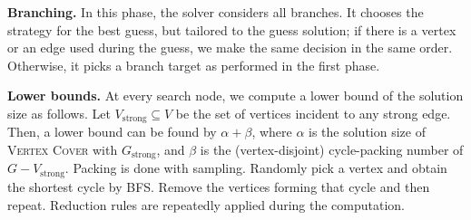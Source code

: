 \documentclass[a4paper,UKenglish,cleveref, autoref, thm-restate]{lipics-v2021}
\begin{document}
\textbf{Branching.} In this phase, the solver considers all branches.
It chooses the strategy for the best guess, but tailored to the guess solution;
 if there is a vertex or an edge used during the guess, we make the same decision in the same order.
Otherwise, it picks a branch target as performed in the first phase.

\textbf{Lower bounds.} At every search node, we compute a lower bound of the solution size as follows.
Let $V_\text{strong} \subseteq V$ be the set of vertices incident to any strong edge.
Then, a lower bound can be found by $\alpha + \beta$,
 where $\alpha$ is the solution size of \textsc{Vertex Cover} with $G_\text{strong}$,
 and $\beta$ is the (vertex-disjoint) cycle-packing number of $G - V_\text{strong}$.
Packing is done with sampling. Randomly pick a vertex and obtain the shortest cycle by BFS.
Remove the vertices forming that cycle and then repeat.
%
Reduction rules are repeatedly applied during the computation.




\end{document}
